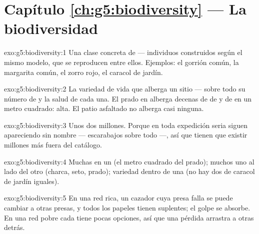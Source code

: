 \section*{Capítulo \ref{ch:g5:biodiversity} --- La biodiversidad}

\begin{solution}{exo:g5:biodiversity:1}
Una clase concreta de  --- individuos construidos según el
mismo modelo, que se reproducen entre ellos. Ejemplos: el gorrión
común, la margarita común, el zorro rojo, el caracol de jardín.
\end{solution}

\begin{solution}{exo:g5:biodiversity:2}
La variedad de vida que alberga un sitio --- sobre todo su número de
 y la salud de cada una. El prado en  alberga decenas de
 de  y de  en un metro cuadrado: 
alta. El patio asfaltado no alberga casi ninguna.
\end{solution}

\begin{solution}{exo:g5:biodiversity:3}
Unos dos millones. Porque en toda expedición seria siguen apareciendo
 sin nombre --- escarabajos sobre todo ---, así que tienen que
existir millones más fuera del catálogo.
\end{solution}

\begin{solution}{exo:g5:biodiversity:4}
Muchas  en un  (el metro cuadrado del prado); muchos
 uno al lado del otro (charca, seto, prado); variedad dentro
de una  (no hay dos  de caracol de jardín iguales).
\end{solution}

\begin{solution}{exo:g5:biodiversity:5}
En una red rica, un cazador cuya presa falla se puede cambiar a otras
presas, y todos los papeles tienen suplentes; el golpe se absorbe. En
una red pobre cada  tiene pocas opciones, así que una pérdida
arrastra a otras detrás.
\end{solution}

